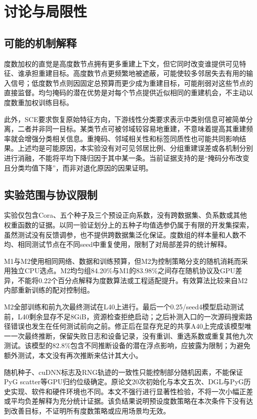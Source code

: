 \section{讨论与局限性}\label{sec:limitations}
\subsection{可能的机制解释}
度数加权的直觉是高度数节点拥有更多重建上下文，但它同时改变谁提供可见特征、谁承担重建目标。高度数节点更频繁地被遮蔽，可能使较多邻居失去有用的输入信号；低度数节点则因固定总预算而更少成为重建目标，可能削弱对这些节点的直接监督。均匀掩码的潜在优势是对每个节点提供近似相同的重建机会，不主动以度数重加权训练目标。

此外，SCE要求恢复原始特征方向，下游线性分类要求表示中类别信息可被简单分离，二者并非同一目标。某类节点可被邻域较容易地重建，不意味着提高其重建频率就会增强分类相关信息。重掩码、邻域相关性和标签同质性也可能共同影响结果。上述均是可能原因，本实验没有对可见邻居比例、分组重建误差或各机制分别进行消融，不能将平均下降归因于其中某一条。当前证据支持的是“掩码分布改变且分类均值下降”，而非对退化原因的因果证明。

\subsection{实验范围与协议限制}
实验仅包含Cora、五个种子及三个预设正向系数，没有跨数据集、负系数或其他权重函数的证据。以同一验证划分上的五种子均值选参仍属于有限的开发集探索，虽然测试没有反馈调参，也不提供跨数据集泛化保证。度数组的样本量和人数不均、相同测试节点在不同seed中重复使用，限制了对局部差异的统计解释。

M1与M2使用相同网络、数据和训练预算，但M2为控制策略分支的随机消耗而采用独立CPU选点。M2均匀组84.20\%与M1的83.98\%之间存在随机协议及GPU差异，不能将0.22个百分点解释为度数算法或工程适配提升。有效算法比较来自M2内部重新训练的配对控制组。

M2全部训练和前九次最终测试在L40上进行。最后一个0.25/seed4模型启动测试前，L40剩余显存不足8GiB，资源检查拒绝启动；之后补测入口的一次源码搜索路径错误也发生在任何测试前向之前。修正后在显存充足的共享A40上完成该模型唯一一次最终推断，保留失败日志和设备记录，没有重训、重选系数或重复其他九次测试。该模型的82.8\%包含不同推断设备的潜在浮点影响，应披露为限制；为避免额外测试，本文没有再次推断来估计其大小。

随机种子、cuDNN标志及RNG轨迹的一致性只能控制部分随机因素，不能保证PyG scatter等GPU归约位级确定。原论文20次初始化与本文五次、DGL与PyG历史实现、软件和硬件环境也不同。本文不强行进行显著性检验，不将一次小幅正差或平均负差解释为充分统计证据。该负结果说明预设度数策略在本次条件下没有达到改善目标，不证明所有度数策略或应用场景均无效。
